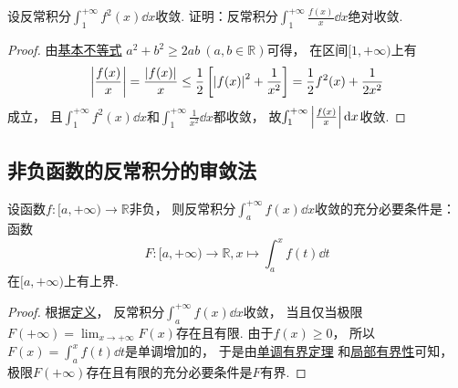 \begin{example}
设反常积分\(\int_1^{+\infty} f^2(x) \dd{x}\)收敛.
证明：反常积分\(\int_1^{+\infty} \frac{f(x)}{x} \dd{x}\)绝对收敛.
\begin{proof}
由\hyperref[theorem:不等式.基本不等式2]{基本不等式}
\(a^2 + b^2 \geq 2ab\ (a,b\in\mathbb{R})\)可得，
在区间\([1,+\infty)\)上有\begin{equation*}
	\abs{\frac{f(x)}{x}}
	= \frac{\abs{f(x)}}{x}
	\leq \frac{1}{2} \left[
		\abs{f(x)}^2 + \frac{1}{x^2}
	\right]
	= \frac{1}{2} f^2(x) + \frac{1}{2x^2}
\end{equation*}成立，
且\(\int_1^{+\infty} f^2(x) \dd{x}\)和\(\int_1^{+\infty} \frac{1}{x^2} \dd{x}\)都收敛，
故\(\int_1^{+\infty} \abs{\frac{f(x)}{x}} \dd{x}\)收敛.
\end{proof}
\end{example}

\subsection{非负函数的反常积分的审敛法}
\begin{theorem}\label{theorem:定积分.无穷限反常积分的审敛法引理}
设函数\(f\colon[a,+\infty)\to\mathbb{R}\)非负，
则反常积分\(\int_a^{+\infty} f(x) \dd{x}\)收敛的充分必要条件是：
函数\begin{equation*}
	F\colon[a,+\infty)\to\mathbb{R},
	x \mapsto \int_a^x f(t) \dd{t}
\end{equation*}在\([a,+\infty)\)上有上界.
\begin{proof}
根据\hyperref[definition:定积分.无穷限的反常积分的定义1]{定义}，
反常积分\(\int_a^{+\infty} f(x) \dd{x}\)收敛，
当且仅当极限\(F(+\infty) = \lim_{x\to+\infty} F(x)\)存在且有限.
由于\(f(x)\geq0\)，
所以\(F(x) = \int_a^x f(t) \dd{t}\)是单调增加的，
于是由\hyperref[theorem:极限.函数的单调有界定理]{单调有界定理}%
和\hyperref[theorem:极限.函数极限的局部有界性]{局部有界性}可知，
极限\(F(+\infty)\)存在且有限的充分必要条件是\(F\)有界.
\end{proof}
\end{theorem}

